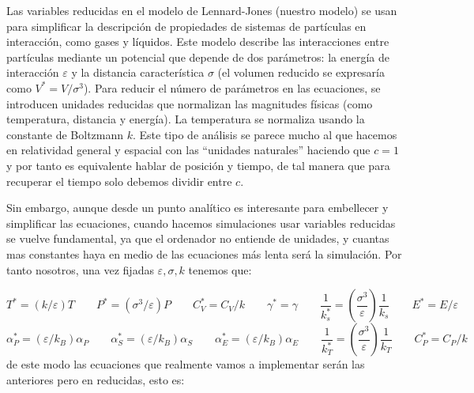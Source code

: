 \documentclass[11pt]{article} %
\newcommand{\parentesis}[1]{\left( #1  \right)}
\newcommand{\dquad}{\quad \quad}
\begin{document}
Las variables reducidas en el modelo de Lennard-Jones (nuestro modelo) se usan para simplificar la descripción de propiedades de sistemas de partículas en interacción, como gases y líquidos. Este modelo describe las interacciones entre partículas mediante un potencial que depende de dos parámetros: la energía de interacción $\varepsilon$ y la distancia característica $\sigma$ (el volumen reducido se expresaría como $V^*=V/\sigma^3$). Para reducir el número de parámetros en las ecuaciones, se introducen unidades reducidas que normalizan las magnitudes físicas (como temperatura, distancia y energía). La temperatura se normaliza usando la constante de Boltzmann $k$. Este tipo de análisis se parece mucho al que hacemos en relatividad general y espacial con las ``unidades naturales'' haciendo que $c=1$ y por tanto es equivalente hablar de posición y tiempo, de tal manera que para recuperar el tiempo solo debemos dividir entre $c$. 


Sin embargo, aunque desde un punto analítico es interesante para embellecer y simplificar las ecuaciones, cuando hacemos simulaciones usar variables reducidas se vuelve fundamental, ya que el ordenador no entiende de unidades, y cuantas mas constantes haya en medio de las ecuaciones más lenta será la simulación. Por tanto nosotros, una vez fijadas $\varepsilon,\sigma,k$ tenemos que:

\begin{equation*}
	T^* = (k/\varepsilon) T \dquad P^* =(\sigma^3 / \varepsilon)  P  \dquad C_V^* = C_V/k \dquad \gamma^* = \gamma \dquad \frac{1}{k_s^*} =\parentesis{\frac{\sigma^3}{\varepsilon}} \frac{1}{k_s}  \dquad E^*=E/\varepsilon
\end{equation*}
\begin{equation*}
	\alpha_P^* = (\varepsilon/k_B) \alpha_P \dquad
	\alpha_S^* = (\varepsilon/k_B) \alpha_S \dquad
	\alpha_E^* = (\varepsilon/k_B) \alpha_E \dquad
	\frac{1}{k_T^*} = \parentesis{\frac{\sigma^3}{\varepsilon}} \frac{1}{k_T} \dquad C_P^*=C_P/k
\end{equation*}
de este modo las ecuaciones que realmente vamos a implementar serán las anteriores pero en reducidas, esto es:
\end{document}
